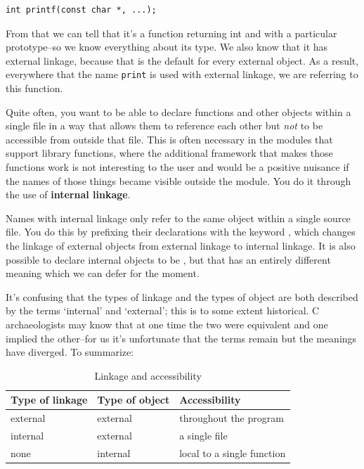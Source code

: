 \begin{Verbatim}
int printf(const char *, ...);
\end{Verbatim}

  From that we can tell that it's a function returning int and with a
   particular prototype--so we know everything about its type. We also
   know that it has external linkage, because that is the default for every
   external object. As a result, everywhere that the name \texttt{print}
   is used with external linkage, we are referring to this function.


  Quite often, you want to be able to declare functions and other objects
   within a single file in a way that allows them to reference each other
   but \textit{not} to be accessible from outside that file. This is often
   necessary in the modules that support library functions, where the
   additional framework that makes those functions work is not interesting
   to the user and would be a positive nuisance if the names of those things
   became visible outside the module. You do it through the use of
   \textbf{internal linkage}.


  Names with internal linkage only refer to the same object within a
   single source file. You do this by prefixing their declarations with the
   keyword \static, which changes the linkage of external
   objects from external linkage to internal linkage. It is also possible to
   declare internal objects to be \static, but that has an
   entirely different meaning which we can defer for the moment.


  It's confusing that the types of linkage and the types of object are
   both described by the terms `internal' and `external'; this
   is to some extent historical. C archaeologists may know that at one time
   the two were equivalent and one implied the other--for us it's
   unfortunate that the terms remain but the meanings have diverged. To
   summarize:


   \begin{table}[htb]
     \centering
     \begin{tabular}{lll}
       \toprule
       Type of linkage & Type of object & Accessibility   \\
       \midrule
       external & external & throughout the program   \\
       internal & external & a single file   \\
       none & internal & local to a single function   \\
       \bottomrule
     \end{tabular}
     \caption{\label{tab:linkAccess}Linkage and accessibility}
   \end{table}


